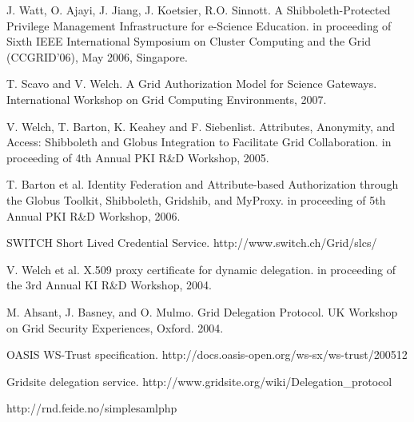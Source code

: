 \documentclass[conference]{IEEEtran}
\begin{document}
\begin{thebibliography}{1}
J. Watt, O. Ajayi, J. Jiang, J. Koetsier, R.O. Sinnott. A Shibboleth-Protected 
Privilege Management Infrastructure for e-Science Education. in proceeding of Sixth 
IEEE International Symposium on Cluster Computing and the Grid (CCGRID'06), May 2006,
Singapore.

T. Scavo and V. Welch. A Grid Authorization Model for Science Gateways. International 
Workshop on Grid Computing Environments, 2007.

V. Welch, T. Barton, K. Keahey and F. Siebenlist. Attributes, Anonymity, and 
Access: Shibboleth and Globus Integration to Facilitate Grid Collaboration. in 
proceeding of 4th Annual PKI R\&D Workshop, 2005.

T. Barton et al. Identity Federation and Attribute-based Authorization 
through the Globus Toolkit, Shibboleth, Gridshib, and MyProxy. in proceeding 
of 5th Annual PKI R\&D Workshop, 2006.

SWITCH Short Lived Credential Service. http://www.switch.ch/Grid/slcs/

V. Welch et al. X.509 proxy certificate for dynamic delegation. in proceeding 
of the 3rd Annual KI R\&D Workshop, 2004.

M. Ahsant, J. Basney, and O. Mulmo. Grid Delegation Protocol. UK Workshop on 
Grid Security Experiences, Oxford. 2004.

OASIS WS-Trust specification. http://docs.oasis-open.org/ws-sx/ws-trust/200512

Gridsite delegation service. http://www.gridsite.org/wiki/Delegation\_protocol

http://rnd.feide.no/simplesamlphp

\end{thebibliography}
\end{document}
